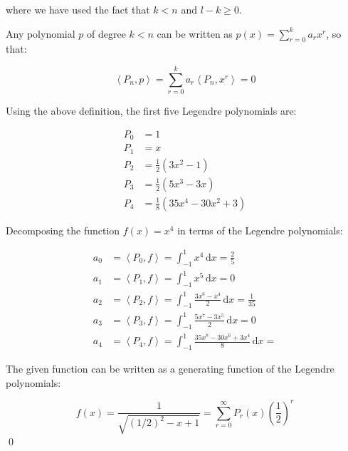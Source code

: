 \documentclass[12pt]{article}
\begin{document}
where we have used the fact that $k < n$ and $l - k \ge 0$.

Any polynomial $p$ of degree $k < n$ can be written as $p(x) = \sum_{r = 0}^{k} a_{r} x^{r}$, so that:

\begin{equation}
    \left\langle P_{n}, p \right\rangle = \sum_{r = 0}^{k} a_{r} \left\langle P_{n}, x^{r} \right\rangle = 0
\end{equation}

Using the above definition, the first five Legendre polynomials are:

\begin{equation}
\begin{split}
    P_{0} &= 1 \\
    P_{1} &= x \\
    P_{2} &= \frac{1}{2} (3x^{2} - 1) \\
    P_{3} &= \frac{1}{2} (5x^{3} - 3x) \\
    P_{4} &= \frac{1}{8} (35x^{4} - 30x^{2} + 3)
\end{split}
\end{equation}

Decomposing the function $f(x) = x^{4}$ in terms of the Legendre polynomials:

\begin{equation}
\begin{split}
    a_{0} &= \left\langle P_{0}, f \right\rangle = \int_{-1}^{1} x^{4} \, \mathrm{d}x = \frac{2}{5} \\
    a_{1} &= \left\langle P_{1}, f \right\rangle = \int_{-1}^{1} x^{5} \, \mathrm{d}x = 0 \\
    a_{2} &= \left\langle P_{2}, f \right\rangle = \int_{-1}^{1} \frac{3x^{6} - x^{4}}{2} \, \mathrm{d}x = \frac{1}{35} \\
    a_{3} &= \left\langle P_{3}, f \right\rangle = \int_{-1}^{1} \frac{5x^{7} - 3x^{5}}{2} \, \mathrm{d}x = 0 \\
    a_{4} &= \left\langle P_{4}, f \right\rangle = \int_{-1}^{1} \frac{35x^{8} - 30x^{6} + 3x^{4}}{8} \, \mathrm{d}x = {}
\end{split}
\end{equation}

The given function can be written as a generating function of the Legendre polynomials:

\begin{equation}
    f(x) = \frac{1}{\sqrt{(1/2)^2 - x + 1}} = \sum_{r = 0}^{\infty} P_{r}(x) \left( \frac{1}{2} \right)^{r}
\end{equation}
\qed
\end{document}
